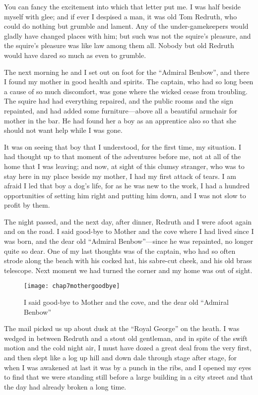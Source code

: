 You can fancy the excitement into which that letter put me. I was half beside myself with glee; and if ever I despised a man, it was old Tom Redruth, who could do nothing but grumble and lament. Any of the under-gamekeepers would gladly have changed places with him; but such was not the squire’s pleasure, and the squire’s pleasure was like law among them all. Nobody but old Redruth would have dared so much as even to grumble.

The next morning he and I set out on foot for the \enquote{Admiral Benbow}, and there I found my mother in good health and spirits. The captain, who had so long been a cause of so much discomfort, was gone where the wicked cease from troubling. The squire had had everything repaired, and the public rooms and the sign repainted, and had added some furniture---above all a beautiful armchair for mother in the bar. He had found her a boy as an apprentice also so that she should not want help while I was gone.

It was on seeing that boy that I understood, for the first time, my situation. I had thought up to that moment of the adventures before me, not at all of the home that I was leaving; and now, at sight of this clumsy stranger, who was to stay here in my place beside my mother, I had my first attack of tears. I am afraid I led that boy a dog’s life, for as he was new to the work, I had a hundred opportunities of setting him right and putting him down, and I was not slow to profit by them.

 

The night passed, and the next day, after dinner, Redruth and I were afoot again and on the road. I said good-bye to Mother and the cove where I had lived since I was born, and the dear old \enquote{Admiral Benbow}---since he was repainted, no longer quite so dear. One of my last thoughts was of the captain, who had so often strode along the beach with his cocked hat, his sabre-cut cheek, and his old brass telescope. Next moment we had turned the corner and my home was out of sight.

\begin{figure}[p]
\centering
\texttt{[image: chap7mothergoodbye]}
\caption[I said good-bye to Mother]{I said good-bye to Mother and the cove, and the dear old \enquote{Admiral Benbow}}
\end{figure}


The mail picked us up about dusk at the \enquote{Royal George} on the heath. I was wedged in between Redruth and a stout old gentleman, and in spite of the swift motion and the cold night air, I must have dozed a great deal from the very first, and then slept like a log up hill and down dale through stage after stage, for when I was awakened at last it was by a punch in the ribs, and I opened my eyes to find that we were standing still before a large building in a city street and that the day had already broken a long time.

